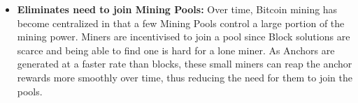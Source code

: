 \begin{itemize}
    \item \textbf{Eliminates need to join Mining Pools:} 
        Over time, Bitcoin mining has become centralized in that a few Mining Pools control a large portion of the mining power.
        Miners are incentivised to join a pool since Block solutions are scarce and being able to find one is hard for a lone miner.
        As Anchors are generated at a faster rate than blocks, these small miners can reap the anchor rewards more smoothly over time, thus reducing the need for them to join the pools. 
        
	
\end{itemize}

